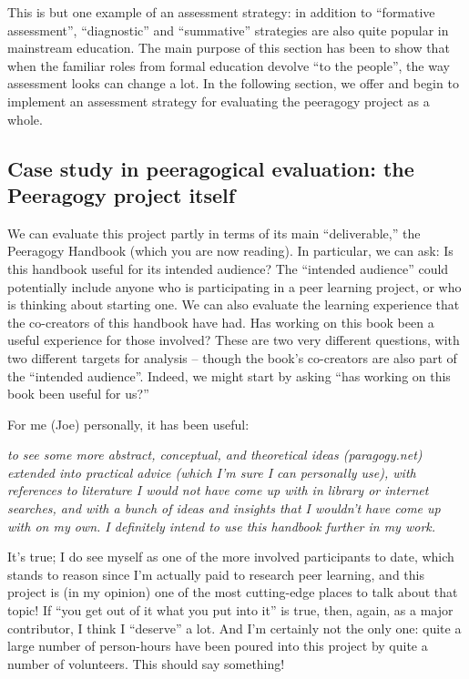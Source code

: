 This is but one example of an assessment strategy: in addition to
``formative assessment'', ``diagnostic'' and ``summative'' strategies
are also quite popular in mainstream education. The main purpose of this
section has been to show that when the familiar roles from formal
education devolve ``to the people'', the way assessment looks can change
a lot. In the following section, we offer and begin to implement an
assessment strategy for evaluating the peeragogy project as a whole.

\subsection{Case study in peeragogical evaluation: the Peeragogy project
itself}

We can evaluate this project partly in terms of its main
``deliverable,'' the Peeragogy Handbook (which you are now reading). In
particular, we can ask: Is this handbook useful for its intended
audience? The ``intended audience'' could potentially include anyone who
is participating in a peer learning project, or who is thinking about
starting one. We can also evaluate the learning experience that the
co-creators of this handbook have had. Has working on this book been a
useful experience for those involved? These are two very different
questions, with two different targets for analysis -- though the book's
co-creators are also part of the ``intended audience''. Indeed, we might
start by asking ``has working on this book been useful for us?''

For me (Joe) personally, it has been useful:

\emph{to see some more abstract, conceptual, and theoretical ideas
(paragogy.net) extended into practical advice (which I'm sure I can
personally use), with references to literature I would not have come up
with in library or internet searches, and with a bunch of ideas and
insights that I wouldn't have come up with on my own. I definitely
intend to use this handbook further in my work.}

It's true; I do see myself as one of the more involved participants to
date, which stands to reason since I'm actually paid to research peer
learning, and this project is (in my opinion) one of the most
cutting-edge places to talk about that topic! If ``you get out of it
what you put into it'' is true, then, again, as a major contributor, I
think I ``deserve'' a lot. And I'm certainly not the only one: quite a
large number of person-hours have been poured into this project by quite
a number of volunteers. This should say something!

